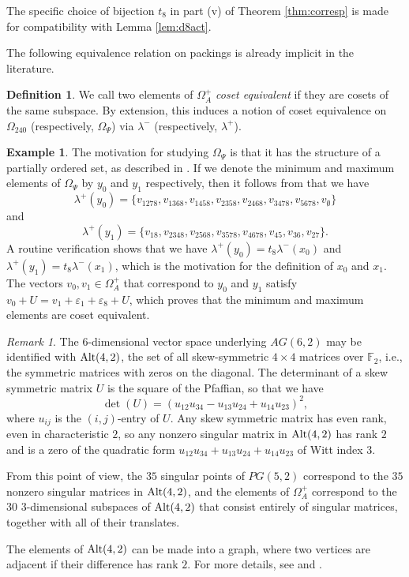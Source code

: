 \documentclass{amsart}
\theoremstyle{plain}
\theoremstyle{definition}
\newtheorem{defn}[theorem]{Definition}
\newtheorem{exa}[theorem]{Example}
\theoremstyle{remark}
\newtheorem{rmk}[theorem]{Remark}
\numberwithin{equation}{section}
\newcommand{\ep}{\varepsilon}
\newcommand{\F}{{\mathbb F}}
\newcommand{\Alt}{\text{\rm Alt}}
\newcommand{\qpx}{\Omega_{240}}
\newcommand{\qp}{\Omega}
\newcommand{\slm}{\lambda^-}
\newcommand{\slp}{\lambda^+}
\begin{document}
The specific choice of bijection $t_8$ in part (v) of Theorem \ref{thm:corresp} is made for compatibility with 
Lemma \ref{lem:d8act}.

The following equivalence relation on packings is already implicit in the literature.

\begin{defn}\label{def:coseteq}
We call two elements of $\qp^+_A$ {\it coset equivalent} if they are cosets of the same subspace. By extension,
this induces a notion of coset equivalence on $\qpx$ (respectively, $\qp_\Psi$) via $\slm$ (respectively, $\slp$).
\end{defn}

\begin{exa}\label{exa:thcthn}
The motivation for studying $\qp_\Psi$ is that it has the structure of a partially ordered set, as described in
\cite[\S6.3]{gx5}. If we denote the minimum and maximum elements of $\qp_\Psi$ by $y_0$ and $y_1$ respectively,
then it follows from \cite[Remark 6.10 (ii)]{gx5} that we have $$
\slp(y_0) = \{v_{1278}, v_{1368}, v_{1458}, v_{2358}, v_{2468}, v_{3478}, v_{5678}, v_\emptyset\}
$$ and $$
\slp(y_1) = \{v_{18}, v_{2348}, v_{2568}, v_{3578}, v_{4678}, v_{45}, v_{36}, v_{27}\}
.$$ A routine verification shows that we have $\slp(y_0) = t_8 \slm(x_0)$ and $\slp(y_1) = t_8 \slm(x_1)$,
which is the motivation for the definition of $x_0$ and $x_1$. The vectors $v_0, v_1 \in \qp^+_A$ that correspond 
to $y_0$ and $y_1$ satisfy $v_0 + U = v_1 + \ep_1 + \ep_8 + U$, which proves that the minimum and maximum elements 
are coset equivalent.
\end{exa}

\begin{rmk}\label{rmk:hhz}
The $6$-dimensional vector space underlying $AG(6, 2)$ may be identified with $\Alt(4, 2)$, the set of all
skew-symmetric $4 \times 4$ matrices over $\F_2$, i.e., the symmetric matrices with zeros
on the diagonal. The determinant of a skew symmetric matrix $U$ is the square of the Pfaffian, so that we have $$
\det(U) = (u_{12}u_{34} - u_{13}u_{24} + u_{14}u_{23})^2
,$$ where $u_{ij}$ is the $(i, j)$-entry of $U$. Any skew symmetric matrix has even rank, even in characteristic $2$,
so any nonzero singular matrix in $\Alt(4, 2)$ has rank $2$ and is a zero of the quadratic form 
$u_{12}u_{34} + u_{13}u_{24} + u_{14}u_{23}$ of Witt index 3.

From this point of view, the $35$ singular points of $PG(5, 2)$  correspond to the $35$ nonzero singular matrices in
$\Alt(4, 2)$, and the elements of $\qp^+_A$ correspond to the $30$ $3$-dimensional subspaces of $\Alt(4, 2)$ that 
consist entirely of singular matrices, together with all of their translates.

The elements of $\Alt(4, 2)$ can be made into a graph, where two vertices are adjacent if their difference has rank
$2$. For more details, see \cite{huang15} and \cite[\S3.4.2]{brouwer22}.
\end{rmk}
\end{document}
